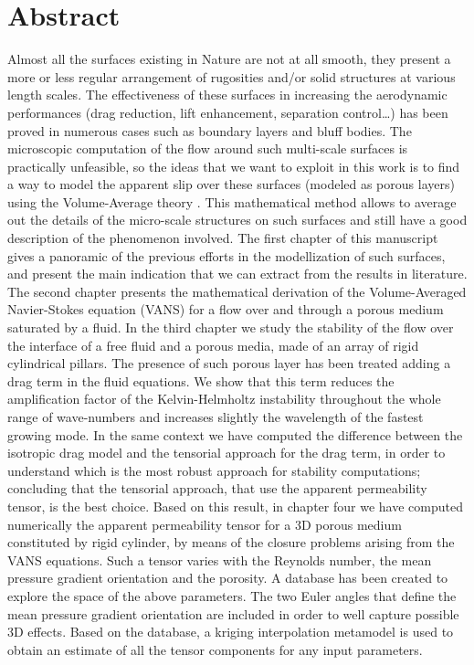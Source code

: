 \chapter*{Abstract}

Almost all the surfaces existing in Nature are not at all smooth, they present a more or less regular arrangement of rugosities and/or solid structures at various length scales.
The effectiveness of these surfaces in increasing the aerodynamic performances (drag reduction, lift enhancement, separation control…) has been proved in numerous cases such as boundary layers and bluff bodies.
The microscopic computation of the flow around such multi-scale surfaces is practically unfeasible, so the ideas that we want to exploit in this work is to find a way to model the apparent slip over these surfaces (modeled as porous layers) using the Volume-Average theory \citet{whitaker2013method}.
This mathematical method allows to average out the details of the micro-scale structures on such surfaces and still have a good description of the phenomenon involved.
The first chapter of this manuscript gives a panoramic of the previous efforts in the modellization of such surfaces, and present the main indication that we can extract from the results in literature.
The second chapter presents the mathematical derivation of the Volume-Averaged Navier-Stokes equation (VANS) for a flow over and through a porous medium saturated by a fluid.
In the third chapter we study the stability of the flow over the interface of a free fluid and a porous media, made of an array of rigid cylindrical pillars.
The presence of such porous layer has been treated adding a drag term in the fluid equations. 
We show that this term reduces the amplification factor of the Kelvin-Helmholtz instability throughout the whole range of wave-numbers and increases slightly the wavelength of the fastest growing mode.
In the same context we have computed the difference between the isotropic drag model and the tensorial approach for the drag term, in order to understand which is the most robust approach for stability computations; concluding that the tensorial approach, that use the apparent permeability tensor, is the best choice.
Based on this result, in chapter four we have computed numerically the apparent permeability tensor for a 3D porous medium constituted by rigid cylinder, by means of the closure problems arising from the VANS equations. Such a tensor varies with the Reynolds number, the mean pressure gradient orientation and the porosity. A database has been created to explore the space of the above parameters. The two Euler angles that define the mean pressure gradient orientation are included in order to well capture possible 3D effects. Based on the database, a kriging interpolation metamodel is used to obtain an estimate of all the tensor components for any input parameters. 
